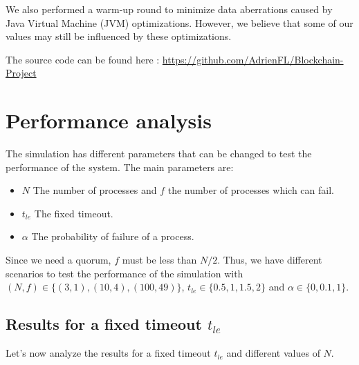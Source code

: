 \documentclass{article}
\begin{document}
We also performed a warm-up round to minimize data aberrations caused by Java Virtual Machine (JVM) optimizations. However, we believe that some of our values may still be influenced by these optimizations.

The source code can be found here : \href{https://github.com/AdrienFL/Blockchain-Project}{https://github.com/AdrienFL/Blockchain-Project}

\newpage

\section{Performance analysis}
The simulation has different parameters that can be changed to test the performance of the system. The main parameters are:

\begin{itemize}
    \item $N$ The number of processes and $f$ the number of processes which can fail.
    \item $t_{le}$ The fixed timeout.
    \item $\alpha$ The probability of failure of a process.
\end{itemize}

Since we need a quorum, $f$ must be less than $N/2$. Thus,
we have different scenarios to test the performance of the simulation
with $(N,f) \in \{(3,1),(10,4),(100,49)\}$, $t_{le} \in \{0.5,1,1.5,2\}$ and $\alpha \in \{0,0.1,1\}$.

\subsection{Results for a fixed timeout $t_{le}$}
Let's now analyze the results for a fixed timeout $t_{le}$ and different values of $N$.
\end{document}
